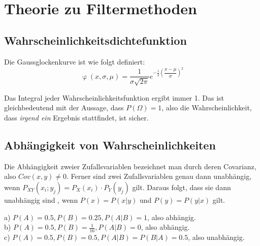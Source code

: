 \documentclass{../Vorlage/mat}
\begin{document}
 \\

\section{Theorie zu Filtermethoden}
\subsection*{Wahrscheinlichkeitsdichtefunktion}
Die Gaussglockenkurve ist wie folgt definiert:
\begin{equation}
	\upvarphi(x, \sigma, \mu) = \dfrac{1}{\sigma\sqrt{2\pi}}e^{-\frac{1}{2}\left(\dfrac{x-\mu}{\sigma}\right)^2}
\end{equation}

Das Integral jeder Wahrscheinlichkeitsfunktion ergibt immer 1. Das ist gleichbedeutend mit der Aussage, dass $P(\Omega) = 1$, also die Wahrscheinlichkeit, dass \textit{irgend ein} Ergebnis stattfindet, ist sicher.

\subsection*{Abhängigkeit von Wahrscheinlichkeiten}

Die Abhängigkeit zweier Zufallsvariablen bezeichnet man durch deren Covarianz, also $Cov(x,y) \neq 0$. Ferner sind zwei Zufallsvariablen genau dann unabhängig, wenn $P_{XY}(x_i;y_j) = P_X(x_i)\cdot P_Y(y_j)$ gilt. Daraus folgt, dass sie dann unabhängig sind , wenn $P(x) = P(x | y)$ und $P(y) = P(y | x)$ gilt.

a) 
$P(A) = 0.5 , P(B) = 0.25, P(A|B) = 1$, also abhängig.\\
b)
$P(A) = 0.5, P(B) = \frac{1}{16}, P(A|B) = 0$, also abhängig.\\
c)
$P(A) = 0.5, P(B) = 0.5, P(A|B) = P(B|A) = 0.5$, also unabhängig.
\end{document}
